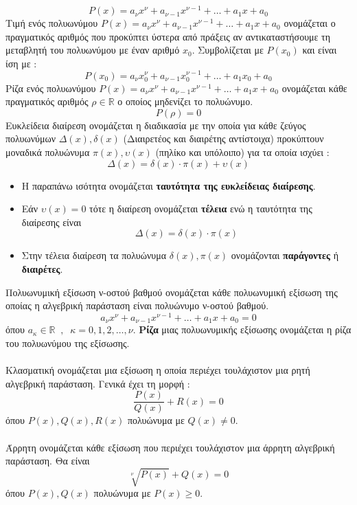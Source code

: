 \documentclass[twoside,nofonts,internet,shmeiwseis]{thewria}
\begin{document}
\[ P(x)=a_\nu x^\nu+a_{\nu-1}x^{\nu-1}+\ldots+a_1x+a_0 \]
Τιμή ενός πολυωνύμου $ P(x)=a_\nu x^\nu+a_{\nu-1}x^{\nu-1}+\ldots+a_1x+a_0 $ ονομάζεται ο πραγματικός αριθμός που προκύπτει ύστερα από πράξεις αν αντικαταστήσουμε τη μεταβλητή του πολυωνύμου με έναν αριθμό $ x_0 $. Συμβολίζεται με $ P(x_0) $ και είναι ίση με :
\[ P(x_0)=a_\nu x_0^\nu+a_{\nu-1}x_0^{\nu-1}+\ldots+a_1x_0+a_0 \]
Ρίζα ενός πολυωνύμου $ P(x)=a_\nu x^\nu+a_{\nu-1}x^{\nu-1}+\ldots+a_1x+a_0 $ ονομάζεται κάθε πραγματικός αριθμός $ \rho\in\mathbb{R} $ ο οποίος μηδενίζει το πολυώνυμο.
\[ P(\rho)=0 \]
Ευκλείδεια διαίρεση ονομάζεται η διαδικασία με την οποία για κάθε ζεύγος πολυωνύμων $ \varDelta(x),\delta(x) $ (Διαιρετέος και διαιρέτης αντίστοιχα) προκύπτουν μοναδικά πολυώνυμα $ \pi(x),\upsilon(x) $ (πηλίκο και υπόλοιπο) για τα οποία ισχύει :
\[ \varDelta(x)=\delta(x)\cdot\pi(x)+\upsilon(x) \]
\begin{itemize}[itemsep=0mm]
\item Η παραπάνω ισότητα ονομάζεται \textbf{ταυτότητα της ευκλείδειας διαίρεσης}.
\item Εάν $ \upsilon(x)=0 $ τότε η διαίρεση ονομάζεται \textbf{τέλεια} ενώ η ταυτότητα της διαίρεσης είναι
\[ \varDelta(x)=\delta(x)\cdot\pi(x) \]
\item Στην τέλεια διαίρεση τα πολυώνυμα $ \delta(x),\pi(x) $ ονομάζονται \textbf{παράγοντες} ή \textbf{διαιρέτες}.
\end{itemize}
Πολυωνυμική εξίσωση ν-οστού βαθμού ονομάζεται κάθε πολυωνυμική εξίσωση της οποίας η αλγεβρική παράσταση είναι πολυώνυμο ν-οστού βαθμού.
\[ a_\nu x^\nu+a_{\nu-1}x^{\nu-1}+\ldots+a_1x+a_0=0 \]
όπου $ a_\kappa\in\mathbb{R}\;\;,\;\;\kappa=0,1,2,\ldots,\nu $. \textbf{Ρίζα} μιας πολυωνυμικής εξίσωσης ονομάζεται η ρίζα του πολυωνύμου της εξίσωσης.\\\\
Κλασματική ονομάζεται μια εξίσωση η οποία περιέχει τουλάχιστον μια ρητή αλγεβρική παράσταση. Γενικά έχει τη μορφή :
\[ \dfrac{P(x)}{Q(x)}+R(x)= 0\]
όπου $ P(x),Q(x),R(x) $ πολυώνυμα με $ Q(x)\neq0 $.\\\\
Άρρητη ονομάζεται κάθε εξίσωση που περιέχει τουλάχιστον μια άρρητη αλγεβρική παράσταση. Θα είναι
\[ \sqrt[\nu]{P(x)}+Q(x)=0 \]
όπου $ P(x),Q(x) $ πολυώνυμα με $ P(x)\geq0 $.\\\\
\end{document}
